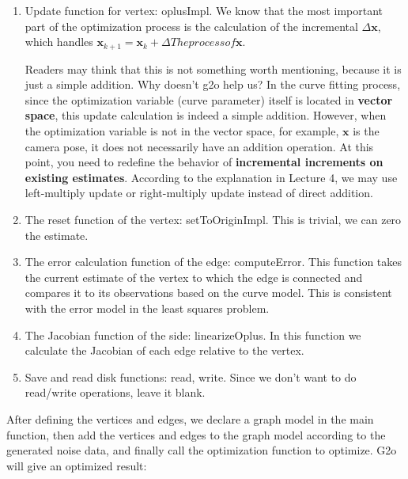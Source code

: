 \begin{enumerate}
\item Update function for vertex: oplusImpl. We know that the most important part of the optimization process is the calculation of the incremental $\Delta \bm{x}$, which handles $\bm{x}_{k+1} = \bm{x}_k + \Delta The process of \bm{x}$.

Readers may think that this is not something worth mentioning, because it is just a simple addition. Why doesn't g2o help us? In the curve fitting process, since the optimization variable (curve parameter) itself is located in \textbf{vector space}, this update calculation is indeed a simple addition. However, when the optimization variable is not in the vector space, for example, $\bm{x}$ is the camera pose, it does not necessarily have an addition operation. At this point, you need to redefine the behavior of \textbf{incremental increments on existing estimates}. According to the explanation in Lecture 4, we may use left-multiply update or right-multiply update instead of direct addition.

\item The reset function of the vertex: setToOriginImpl. This is trivial, we can zero the estimate.

\item The error calculation function of the edge: computeError. This function takes the current estimate of the vertex to which the edge is connected and compares it to its observations based on the curve model. This is consistent with the error model in the least squares problem.
    
\item The Jacobian function of the side: linearizeOplus. In this function we calculate the Jacobian of each edge relative to the vertex.

\item Save and read disk functions: read, write. Since we don't want to do read/write operations, leave it blank.
\end{enumerate}

After defining the vertices and edges, we declare a graph model in the main function, then add the vertices and edges to the graph model according to the generated noise data, and finally call the optimization function to optimize. G2o will give an optimized result:

